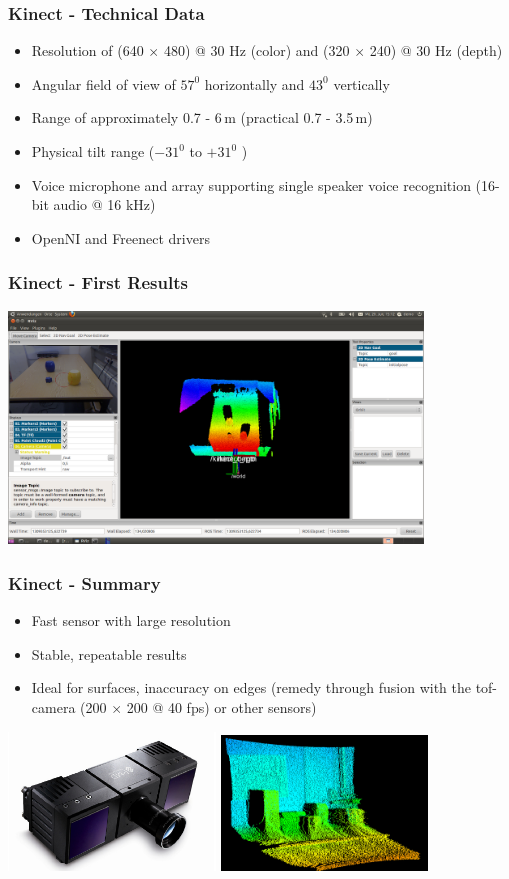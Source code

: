 \begin{frame}
 \frametitle{Kinect - Technical Data}
\begin{itemize}
  \item Resolution of (640 $\times$ 480) @ 30 Hz (color) and (320 $\times$ 240) @ 30 Hz (depth)
  \item Angular field of view of $57^0$ horizontally and $43^0$ vertically
  \item Range of approximately 0.7 - 6\,m (practical 0.7 - 3.5\,m)
  \item Physical tilt range ($-31^0$  to $+31^0$ )
  \item Voice microphone and array supporting single speaker voice recognition (16-bit audio @ 16 kHz)
  \item OpenNI and Freenect drivers
\end{itemize}

\end{frame}


\begin{frame} 
 \frametitle{Kinect - First Results}
\includegraphics[width=11cm]{img/ros_rviz.png}
\end{frame}


\begin{frame}
 \frametitle{Kinect - Summary}
\begin{itemize}
  \item Fast sensor with large resolution
  \item Stable, repeatable results
  \item Ideal for surfaces, inaccuracy on edges (remedy through fusion with the tof-camera (200 $\times$ 200 @ 40 fps) or other sensors)
\end{itemize}
\hspace{3ex}\includegraphics[width=5.5cm]{img/camcube.png}
\includegraphics[width=5.5cm]{img/pmd2.png}
\end{frame}

